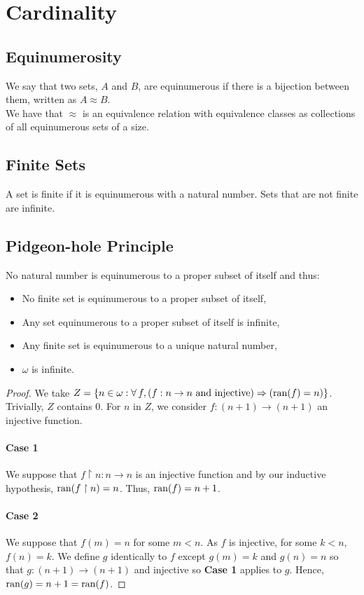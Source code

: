 \section{Cardinality}

\subsection{Equinumerosity}

We say that two sets, $A$ and $B$, are equinumerous if there is a bijection 
between them, written as $A \approx B$.
\\[\baselineskip]
We have that $\approx$ is an equivalence relation with equivalence classes
as collections of all equinumerous sets of a size.

\subsection{Finite Sets}

A set is finite if it is equinumerous with a natural number. Sets that are
not finite are infinite.

\subsection{Pidgeon-hole Principle}

No natural number is equinumerous to a proper subset of itself and thus: \begin{itemize}
    \item No finite set is equinumerous to a proper subset of itself,
    \item Any set equinumerous to a proper subset of itself is infinite,
    \item Any finite set is equinumerous to a unique natural number,
    \item $\omega$ is infinite.
\end{itemize}

\begin{proof}
    We take $Z = \{n \in \omega : \forall \, f, 
    (f : n \to n \text{ and injective}) \Rightarrow (\operatorname{ran}(f) = n)\}$. Trivially,
    $Z$ contains $0$. For $n$ in $Z$, we consider $f : (n + 1) \to (n + 1)$
    an injective function.

    \paragraph{Case 1} We suppose that $f \upharpoonright n : n \to n$
    is an injective function and by our inductive hypothesis,
    $\operatorname{ran}(f \upharpoonright n) = n$. Thus, $\operatorname{ran}(f) = n + 1$.

    \paragraph{Case 2} We suppose that $f(m) = n$ for some $m < n$.
    As $f$ is injective, for some $k < n$, $f(n) = k$. We
    define $g$ identically to $f$ except $g(m) = k$ and $g(n) = n$
    so that $g : (n + 1) \to (n + 1)$ and injective so \textbf{Case 1}
    applies to $g$. Hence, \linebreak $\operatorname{ran}(g) = n + 1 = \operatorname{ran}(f)$.
\end{proof}

